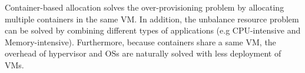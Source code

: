 

Container-based allocation solves the over-provisioning problem by allocating multiple containers in the same VM. In addition, the unbalance resource problem can be solved by combining different types of applications (e.g CPU-intensive and Memory-intensive). Furthermore, because containers share a same VM, the overhead of hypervisor and OSs are naturally solved with less deployment of VMs.











